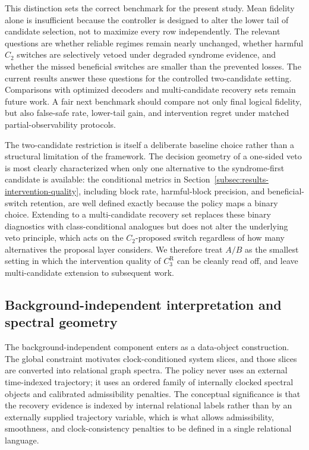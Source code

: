 \documentclass{iopjournal}
\begin{document}
This distinction sets the correct benchmark for the present study. Mean fidelity
alone is insufficient because the controller is designed to alter the lower tail
of candidate selection, not to maximize every row independently. The relevant
questions are whether reliable regimes remain nearly unchanged, whether harmful
$C_2$ switches are selectively vetoed under degraded syndrome evidence, and
whether the missed beneficial switches are smaller than the prevented losses. The
current results answer these questions for the controlled two-candidate setting.
Comparisons with optimized decoders and multi-candidate recovery sets remain
future work.
A fair next benchmark should compare not only final logical fidelity, but also
false-safe rate, lower-tail gain, and intervention regret under matched
partial-observability protocols.

The two-candidate restriction is itself a deliberate baseline choice rather 
than a structural limitation of the framework. The decision geometry of a 
one-sided veto is most clearly characterized when only one alternative to the 
syndrome-first candidate is available: the conditional metrics in 
Section~\ref{subsec:results-intervention-quality}, including block rate, 
harmful-block precision, and beneficial-switch retention, are well defined 
exactly because the policy maps a binary choice. Extending to a multi-candidate 
recovery set replaces these binary diagnostics with class-conditional analogues 
but does not alter the underlying veto principle, which acts on the 
$C_2$-proposed switch regardless of how many alternatives the proposal layer 
considers. We therefore treat $A/B$ as the smallest setting in which the 
intervention quality of $C_3^{\mathrm R}$ can be cleanly read off, and leave 
multi-candidate extension to subsequent work.

\subsection{Background-independent interpretation and spectral geometry}
\label{subsec:discussion-background-independent}

The background-independent component enters as a data-object construction. The 
global constraint motivates clock-conditioned system slices, and those slices are 
converted into relational graph spectra. The policy never uses an external 
time-indexed trajectory; it uses an ordered family of internally clocked spectral 
objects and calibrated admissibility penalties. The conceptual significance is that 
the recovery evidence is indexed by internal relational labels rather than by an 
externally supplied trajectory variable, which is what allows admissibility, 
smoothness, and clock-consistency penalties to be defined in a single relational 
language.
\end{document}
